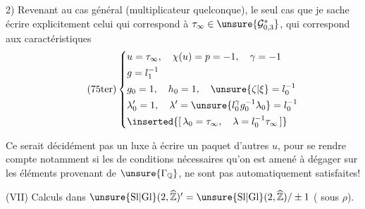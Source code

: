 2) Revenant au cas général (multiplicateur quelconque), le seul cas que je sache écrire explicitement
  celui qui correspond à
$\tau_\infty\in\unsure{\mathcal{G}_{0,3}^{*}}$,
qui correspond aux caractéristiques
\[
\tag{75ter}
\left\{
\begin{aligned}
&u=\tau_\infty,\quad\chi(u)=p=-1,\quad\gamma=-1\\
&g=l_1^{-1}\\
&g_0=1,\quad h_0=1,\quad\unsure{\zeta|\xi}=l_0^{-1}\\
&\lambda'_0=1,\quad\lambda'=\unsure{l_0^\gamma g_0^{-1}\lambda_0}=l_0^{-1}\\
&\inserted{[\,\lambda_0=\tau_\infty,\quad\lambda=l_0^{-1}\tau_\infty\,]}
\end{aligned}
\right.
\]

Ce serait décidément pas un luxe  à écrire un paquet d'autres $u$, pour se rendre compte notamment si les  de conditions nécessaires qu'on est amené à dégager sur les éléments provenant de $\unsure{\Gamma_{\mathbb Q}}$, ne sont pas automatiquement satisfaites!


(VII) Calculs dans $\unsure{\mathrm{Sl}|\mathrm{Gl}}(2,\widehat{\mathbb Z})'=\unsure{\mathrm{Sl}|\mathrm{Gl}}(2,\widehat{\mathbb Z})/\pm1$
( sous $\rho$).


